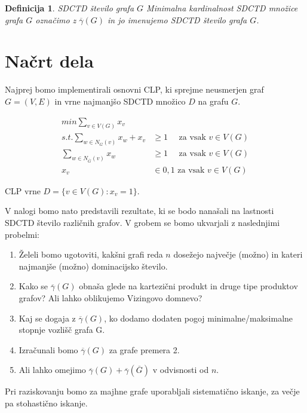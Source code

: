 \documentclass[12pt]{article}
\newtheorem{definition}{Definicija}
\begin{document}
\begin{definition}{SDCTD število grafa $G$}
    Minimalna kardinalnost SDCTD množice grafa $G$ označimo z $\overline{\gamma}(G)$ in jo imenujemo SDCTD število grafa $G$. 
\end{definition}

\section{Načrt dela}
Najprej bomo implementirali osnovni CLP, ki sprejme neusmerjen graf $G = (V,E)$ in vrne najmanjšo SDCTD množico $D$ na grafu $G$. 

\begin{align*}
min \sum_{v \in V(G)} x_v &\\
s.t. \sum_{w \in N_{G}(v)} x_w + x_v &\geq 1 \quad \text{ za vsak } v \in V(G) \\
\sum_{w \in N_{\overline{G}}(v)} x_w &\geq 1 \quad \text{ za vsak } v \in V(G) \\
x_v &\in {0,1} \text{ za vsak } v \in V(G)
\end{align*}

\noindent CLP vrne $D = \{v \in V(G): x_v = 1\}$. 

\vspace{12pt}
\noindent V nalogi bomo nato predstavili rezultate, ki se bodo nanašali na lastnosti SDCTD število različnih grafov. V grobem se bomo ukvarjali z naslednjimi probelmi:
\begin{enumerate}
    \item Želeli bomo ugotoviti, kakšni grafi reda $n$ dosežejo največje (možno) in kateri najmanjše (možno) dominacijsko število.
    \item Kako se $\overline\gamma(G)$ obnaša glede na kartezični produkt in druge tipe produktov grafov? Ali lahko oblikujemo Vizingovo domnevo? 
    \item Kaj se dogaja z $\overline{\gamma}(G)$, ko dodamo dodaten pogoj minimalne/maksimalne stopnje vozlišč grafa G.
    \item Izračunali bomo $\overline{\gamma}(G)$ za grafe premera 2.
    \item Ali lahko omejimo $\overline{\gamma}(G) + \overline{\gamma}(\overline{G})$ v odvisnosti od $n$.
\end{enumerate} 

Pri raziskovanju bomo za majhne grafe uporabljali sistematično iskanje, za večje pa stohastično iskanje.
\end{document}
